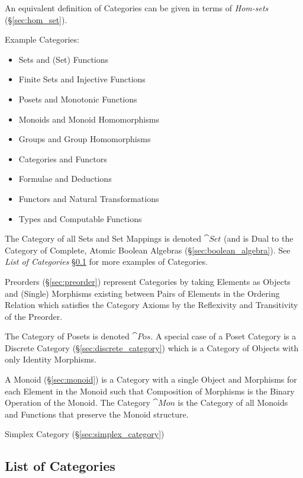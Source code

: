 An equivalent definition of Categories can be given in terms of
\emph{Hom-sets} (\S\ref{sec:hom_set}).

Example Categories:
\begin{itemize}
\item Sets and (Set) Functions
\item Finite Sets and Injective Functions
\item Posets and Monotonic Functions
\item Monoids and Monoid Homomorphisms
\item Groups and Group Homomorphisms
\item Categories and Functors
\item Formulae and Deductions
\item Functors and Natural Transformations
\item Types and Computable Functions
\end{itemize}
The Category of all Sets and Set Mappings is denoted $\cat{Set}$
(and is Dual to the Category of Complete, Atomic Boolean Algebras
(\S\ref{sec:boolean_algebra}). See \emph{List of Categories}
\S\ref{sec:categories_list} for more examples of Categories.

Preorders (\S\ref{sec:preorder}) represent Categories by taking
Elements as Objects and (Single) Morphisms existing between Pairs of
Elements in the Ordering Relation which satisfies the Category Axioms
by the Reflexivity and Transitivity of the Preorder.

The Category of Posets is denoted $\cat{Pos}$. A special case of a
Poset Category is a Discrete Category (\S\ref{sec:discrete_category})
which is a Category of Objects with only Identity Morphisms.

A Monoid (\S\ref{sec:monoid}) is a Category with a single Object and
Morphisms for each Element in the Monoid such that Composition of
Morphisms is the Binary Operation of the Monoid. The Category
$\cat{Mon}$ is the Category of all Monoids and Functions that
preserve the Monoid structure.

Simplex Category (\S\ref{sec:simplex_category})



\subsection{List of Categories}\label{sec:categories_list}

